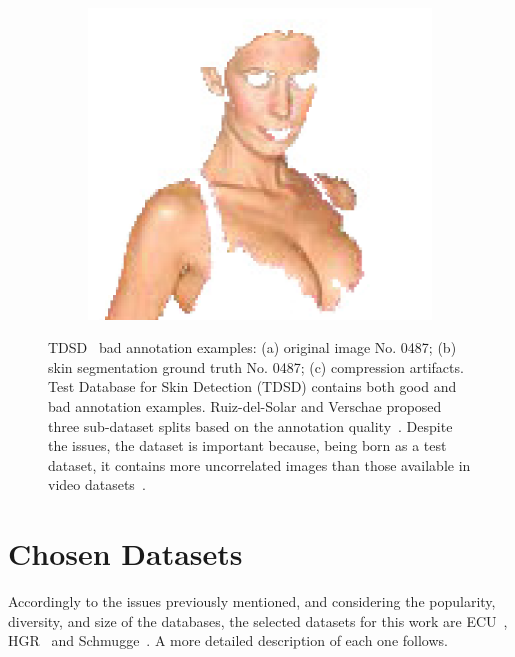 \begin{figure}[!hbt]
\begin{subfigure}[b]{0.4\textwidth}
         \includegraphics[width=\textwidth]{images/datasets/tdsd_artifacts.png}
         \caption{}
         \label{fig:tdsd-gt-noskin}
     \end{subfigure}
        \caption{TDSD~\cite{zhu2004adaptive} bad annotation examples: (a) original image No. 0487; (b) skin segmentation ground truth No. 0487; (c) compression artifacts.
        Test Database for Skin Detection (TDSD) contains both good and bad annotation examples. Ruiz-del-Solar and Verschae proposed three sub-dataset splits based on the annotation quality~\cite{ruiz2006skindiff}.
        Despite the issues, the dataset is important because, being born as a test dataset, it contains more uncorrelated images than those available in video datasets~\cite{bianco2015adaptive}.}
        \label{fig:tdsd-gt}
\end{figure}

\section{Chosen Datasets}\label{sec:chosen-datasets}

Accordingly to the issues previously mentioned, and considering the popularity, diversity, and size of the databases, the selected datasets for this work are ECU~\cite{phung2005skin}, HGR~\cite{Kawulok2014EURASIP} and Schmugge~\cite{schmugge2007objective}. A more detailed description of each one follows.

